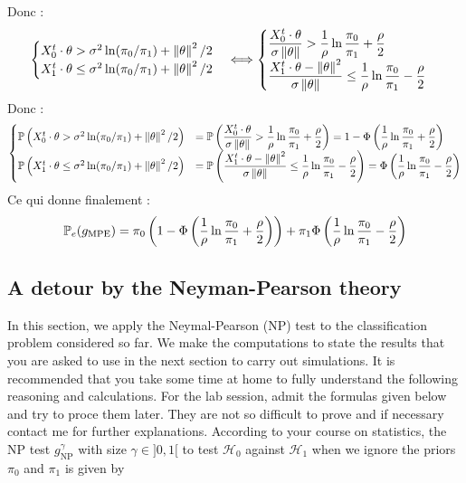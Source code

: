 \documentclass[12pt,a4paper]{article}
\begin{document}
Donc :
$$
\begin{cases}
    X_0^t\cdot\theta >\sigma^2\ln(\pi_0/\pi_1) + \norm{\theta}^2/2 \\
    X_1^t\cdot\theta 
\leq \sigma^2\ln(\pi_0/\pi_1) + \norm{\theta}^2/2
\end{cases} \Longleftrightarrow \begin{cases}
    \dfrac{X_0^t\cdot\theta}{\sigma\norm{\theta}} > \dfrac{1}{\rho}\ln\dfrac{\pi_0}{\pi_1} + \dfrac{\rho}{2} \\
    \dfrac{X_1^t\cdot\theta -\norm{\theta}^2}{\sigma\norm{\theta}}
\leq \dfrac{1}{\rho}\ln\dfrac{\pi_0}{\pi_1} - \dfrac{\rho}{2}
\end{cases}
$$
Donc : 
$$\begin{cases}
    \ens{P}\left(X_0^t\cdot\theta >\sigma^2\ln(\pi_0/\pi_1) + \norm{\theta}^2/2 \right) & = \ens{P}\left(\dfrac{X_0^t\cdot\theta}{\sigma\norm{\theta}} > \dfrac{1}{\rho}\ln\dfrac{\pi_0}{\pi_1} + \dfrac{\rho}{2}\right) = 1-\Phi \left( \dfrac{1}{\rho}\ln\dfrac{\pi_0}{\pi_1} + \dfrac{\rho}{2}\right)  \\

    \ens{P}\left(X_1^t\cdot\theta 
\leq \sigma^2\ln(\pi_0/\pi_1) + \norm{\theta}^2/2 \right) & = \ens{P}\left(\dfrac{X_1^t\cdot\theta -\norm{\theta}^2}{\sigma\norm{\theta}}
\leq \dfrac{1}{\rho}\ln\dfrac{\pi_0}{\pi_1} - \dfrac{\rho}{2}  \right)  = \Phi \left( \dfrac{1}{\rho}\ln\dfrac{\pi_0}{\pi_1} -\dfrac{\rho}{2}\right)
\end{cases}
$$
Ce qui donne finalement : 
$$  \ens{P}_e (g_\text{MPE}) =   \pi_0 \left( 1-\Phi \left( \dfrac{1}{\rho}\ln\dfrac{\pi_0}{\pi_1} + \dfrac{\rho}{2}\right) \right) +\pi_1 \Phi \left( \dfrac{1}{\rho}\ln\dfrac{\pi_0}{\pi_1} - \dfrac{\rho}{2}\right) $$


\subsection{A detour by the Neyman-Pearson theory}
In this section, we apply the Neymal-Pearson (NP) test to the classification problem considered so far.
We make the computations to state the results that you are asked to use in the next section to carry
out simulations. It is recommended that you take some time at home to fully understand the following
reasoning and calculations. For the lab session, admit the formulas given below and try to proce them
later. They are not so difficult to prove and if necessary contact me for further explanations.
According to your course on statistics, the NP test $g^\gamma_\text{NP}$ with size $\gamma \in ]0,1[$  to test $\mathcal{H}_0$ against $\mathcal{H}_1$
when we ignore the priors $\pi_0$ and $\pi_1$ is given by
\end{document}
